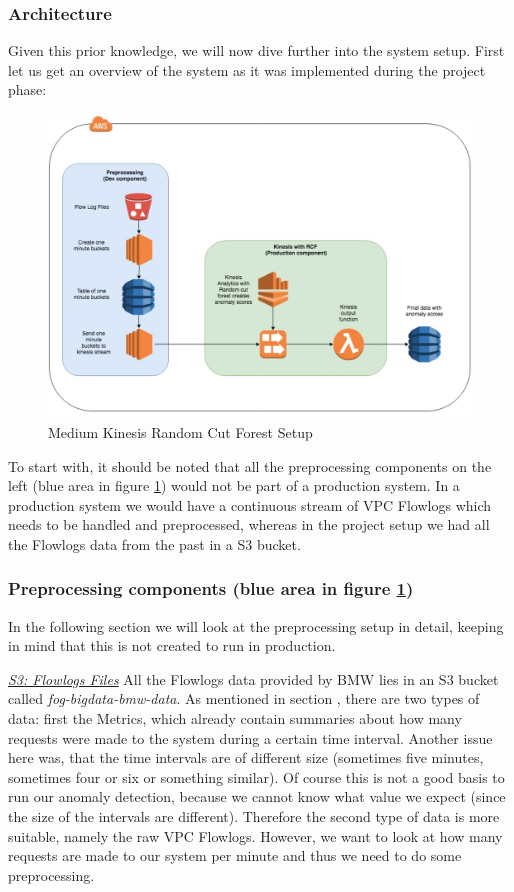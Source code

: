 \subsubsection{Architecture}
Given this prior knowledge, we will now dive further into the system setup.
First let us get an overview of the system as it was implemented during the project phase:
\begin{figure}
    \centering
    \includegraphics[width=1\textwidth]{images/medium-kinesis-setup.png}
    \caption{Medium Kinesis Random Cut Forest Setup}
    \label{fig:medium_kinesis_setup}
\end{figure}
\FloatBarrier
To start with, it should be noted that all the preprocessing components on the left (blue area in figure \ref{fig:medium_kinesis_setup}) would not be part of a production system. In a production system we would have a continuous stream of VPC Flowlogs which needs to be handled and preprocessed, whereas in the project setup we had all the Flowlogs data from the past in a S3 bucket. 

\subsubsection{Preprocessing components (blue area in figure \ref{fig:medium_kinesis_setup})}
In the following section we will look at the preprocessing setup in detail, keeping in mind that this is not created to run in production.

\textit{\underline{S3: Flowlogs Files}}\break
All the Flowlogs data provided by BMW lies in an S3 bucket called \textit{fog-bigdata-bmw-data}. As mentioned in section \pageref{sec:fixed_data}, there are two types of data: first the Metrics, which already contain summaries about how many requests were made to the system during a certain time interval. Another issue here was, that the time intervals are of different size (sometimes five minutes, sometimes four or six or something similar). Of course this is not a good basis to run our anomaly detection, because we cannot know what value we expect (since the size of the intervals are different). Therefore the second type of data is more suitable, namely the raw VPC Flowlogs. However, we want to look at how many requests are made to our system per minute and thus we need to do some preprocessing.

